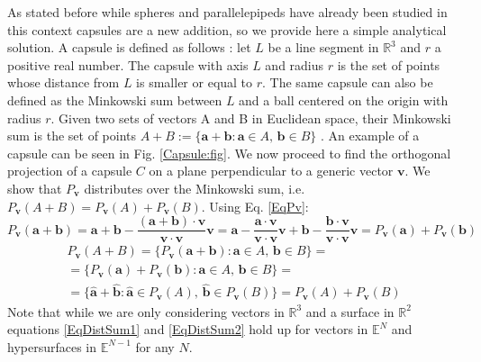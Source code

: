 \documentclass[a4paper,12pt]{article}
\begin{document}
As stated before while spheres and parallelepipeds have already been studied in this context capsules are a new addition, so we provide here a simple analytical solution. A capsule is defined as follows \cite{Pournin}: let $L$ be a line segment in $\mathbb{R}^3$ and $r$ a positive real number. The capsule with axis $L$ and radius $r$ is the set of points whose distance from $L$ is smaller or equal to $r$. The same capsule can also be defined as the Minkowski sum between $L$ and a ball centered on the origin with radius $r$. Given two sets of vectors A and B in Euclidean space, their Minkowski sum is the set of points $A+B := \{\mathbf{a}+\mathbf{b}: \mathbf{a} \in A,\, \mathbf{b} \in B\}$ \cite{Schneider}. An example of a capsule can be seen in Fig. \ref{Capsule:fig}. We now proceed to find the orthogonal projection of a capsule $C$ on a plane perpendicular to a generic vector $\mathbf{v}$. 
We show that $P_\mathbf{v}$ distributes over the Minkowski sum, i.e. $P_\mathbf{v}(A + B) = P_\mathbf{v}(A) + P_\mathbf{v}(B)$. Using Eq. \ref{EqPv}:
%
\begin{equation}\label{EqDistSum1}
P_\mathbf{v}(\mathbf{a}+\mathbf{b}) = \mathbf{a}+\mathbf{b}  -  \frac{(\mathbf{a}+\mathbf{b}) \cdot \mathbf{v}}{\mathbf{v} \cdot \mathbf{v}} \mathbf{v} = \mathbf{a} -  \frac{\mathbf{a} \cdot \mathbf{v}}{\mathbf{v} \cdot \mathbf{v}} \mathbf{v} + \mathbf{b} -  \frac{\mathbf{b} \cdot \mathbf{v}}{\mathbf{v} \cdot \mathbf{v}} \mathbf{v} = P_\mathbf{v}(\mathbf{a}) + P_\mathbf{v}(\mathbf{b})
\end{equation} 
%
\begin{equation}\label{EqDistSum2}
\begin{gathered}
P_\mathbf{v}(A + B) = \{P_\mathbf{v}(\mathbf{a} + \mathbf{b}): \mathbf{a} \in A,\, \mathbf{b} \in B\} = \\
= \{P_\mathbf{v}(\mathbf{a}) + P_\mathbf{v}(\mathbf{b}): \mathbf{a} \in A,\, \mathbf{b} \in B\} = \\
= \{\hat{\mathbf{a}} + \hat{\mathbf{b}}: \hat{\mathbf{a}} \in P_\mathbf{v}(A),\, \hat{\mathbf{b}} \in P_\mathbf{v}(B)\} = P_\mathbf{v}(A) + P_\mathbf{v}(B)
\end{gathered}
\end{equation}
%
Note that while we are only considering vectors in $\mathbb{R}^3$ and a surface in $\mathbb{R}^2$ equations \ref{EqDistSum1} and \ref{EqDistSum2} hold up for vectors in $\mathbb{E}^N$ and hypersurfaces in $\mathbb{E}^{N-1}$ for any $N$.
\end{document}
